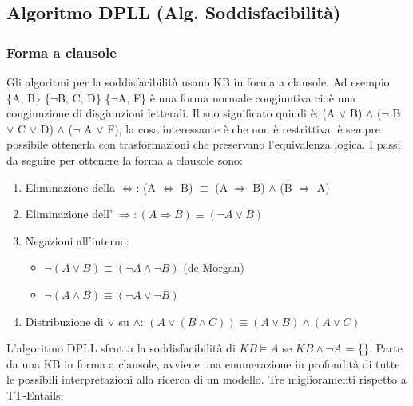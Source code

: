 \documentclass{article}
\begin{document}
\subsection{Algoritmo DPLL (Alg. Soddisfacibilità)}
\subsubsection{Forma a clausole}
Gli algoritmi per la soddisfacibilità usano KB in forma a clausole. \newline 
Ad esempio \{A, B\} \{$\neg$B, C, D\} \{$\neg$A, F\} è una forma normale congiuntiva cioè una congiunzione di disgiunzioni letterali. Il suo significato quindi è: \newline 
(A $\lor$ B) $\land$ ($\neg$ B $\lor$ C $\lor$ D) $\land$ ($\neg$ A $\lor$ F), la cosa interessante è che non è restrittiva: è sempre possibile ottenerla con trasformazioni che preservano l’equivalenza logica. \newline 
I passi da seguire per ottenere la forma a clausole sono: 
\begin{enumerate}
    \item Eliminazione della $\Leftrightarrow$: (A $\Leftrightarrow$ B) $\equiv$ (A $\Rightarrow$ B) $\land$ (B $\Rightarrow$ A)
    \item Eliminazione dell’ $\Rightarrow: (A \Rightarrow B) \equiv (\neg A \lor B)$
    \item Negazioni all’interno: \begin{itemize}
        \item $\neg (A \lor B) \equiv (\neg A \land \neg B)$	(de Morgan)	
        \item $\neg (A \land B) \equiv (\neg A \lor \neg B)$
    \end{itemize}   
    \item Distribuzione di $\lor$ su $\land$: $(A \lor (B \land C)) \equiv (A \lor B) \land (A \lor C)$
\end{enumerate}
L'algoritmo DPLL sfrutta la soddisfacibilità di $KB \models A$ se $KB \land \neg A$ = \{\}. Parte da una KB in forma a clausole, avviene una enumerazione in profondità di tutte le possibili interpretazioni alla ricerca di un modello. Tre miglioramenti rispetto a TT-Entails: 
\end{document}
